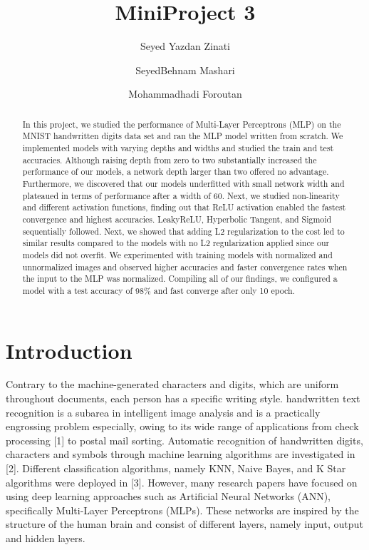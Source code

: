 \documentclass[10pt]{article}
\begin{document}
\title{MiniProject 3}
\author{
    Seyed Yazdan Zinati
    \and
    SeyedBehnam Mashari
    \and
    Mohammadhadi Foroutan
}

\maketitle

\begin{abstract}
    In this project, we studied the performance of Multi-Layer Perceptrons (MLP) on the MNIST handwritten digits data set and ran the MLP model written from scratch. We implemented models with varying depths and widths and studied the train and test accuracies. Although raising depth from zero to two substantially increased the performance of our models, a network depth larger than two offered no advantage. Furthermore, we discovered that our models underfitted with small network width and plateaued in terms of performance after a width of 60. Next, we studied non-linearity and different activation functions, finding out that ReLU activation enabled the fastest convergence and highest accuracies. LeakyReLU, Hyperbolic Tangent, and Sigmoid sequentially followed. Next, we showed that adding L2 regularization to the cost led to similar results compared to the models with no L2 regularization applied since our models did not overfit. We experimented with training models with normalized and unnormalized images and observed higher accuracies and faster convergence rates when the input to the MLP was normalized. Compiling all of our findings, we configured a model with a test accuracy of 98\% and fast converge after only 10 epoch.

\end{abstract}

\section{Introduction}
Contrary to the machine-generated characters and digits, which are uniform throughout documents, each person has a specific writing style. handwritten text recognition is a subarea in intelligent image analysis and is a practically engrossing problem especially, owing to its wide range of applications from check processing [1] to postal mail sorting. Automatic recognition of handwritten digits, characters and symbols through machine learning algorithms are investigated in [2]. Different classification algorithms, namely KNN, Naive Bayes, and K Star algorithms were deployed in [3]. However, many research papers have focused on using deep learning approaches such as Artificial Neural Networks (ANN), specifically Multi-Layer Perceptrons (MLPs). These networks are inspired by the structure of the human brain and consist of different layers, namely input, output and hidden layers.
\end{document}
